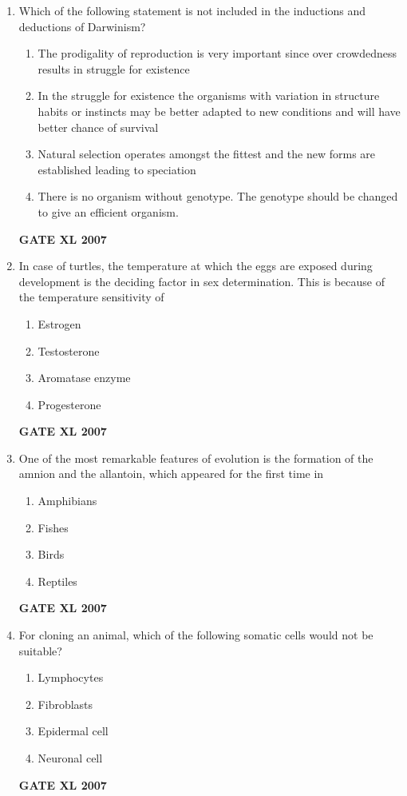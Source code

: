 \documentclass[journal,12pt,onecolumn]{IEEEtran}
\begin{document}
\begin{enumerate}
\item Which of the following statement is not included in the inductions and deductions of Darwinism?
\begin{enumerate}
    \item The prodigality of reproduction is very important since over crowdedness results in struggle for existence
    \item In the struggle for existence the organisms with variation in structure habits or instincts may be better adapted to new conditions and will have better chance of survival
    \item Natural selection operates amongst the fittest and the new forms are established leading to speciation
    \item There is no organism without genotype. The genotype should be changed to give an efficient organism.
\end{enumerate}\hfill{\textbf{GATE XL 2007}}
\item In case of turtles, the temperature at which the eggs are exposed during development is the deciding factor in sex determination. This is because of the temperature sensitivity of
\begin{enumerate}
    \item Estrogen
    \item Testosterone
    \item Aromatase enzyme
    \item Progesterone
\end{enumerate}\hfill{\textbf{GATE XL 2007}}

\item One of the most remarkable features of evolution is the formation of the amnion and the allantoin, which appeared for the first time in
\begin{enumerate}
    \item Amphibians
    \item Fishes
    \item Birds
    \item Reptiles
\end{enumerate}\hfill{\textbf{GATE XL 2007}}

\item For cloning an animal, which of the following somatic cells would not be suitable?
\begin{enumerate}
    \item Lymphocytes
    \item Fibroblasts
    \item Epidermal cell
    \item Neuronal cell
\end{enumerate}\hfill{\textbf{GATE XL 2007}}


\end{enumerate}
\end{document}
